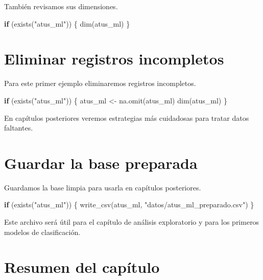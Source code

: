 \documentclass[
  11pt,
  letterpaper,
]{book}
\newenvironment{Shaded}{\begin{snugshade}}{\end{snugshade}}
\newcommand{\ControlFlowTok}[1]{\textcolor[rgb]{0.00,0.23,0.31}{\textbf{#1}}}
\newcommand{\FunctionTok}[1]{\textcolor[rgb]{0.28,0.35,0.67}{#1}}
\newcommand{\NormalTok}[1]{\textcolor[rgb]{0.00,0.23,0.31}{#1}}
\newcommand{\OtherTok}[1]{\textcolor[rgb]{0.00,0.23,0.31}{#1}}
\newcommand{\StringTok}[1]{\textcolor[rgb]{0.13,0.47,0.30}{#1}}
\begin{document}
También revisamos sus dimensiones.

\begin{Shaded}
\begin{Highlighting}[]
\ControlFlowTok{if}\NormalTok{ (}\FunctionTok{exists}\NormalTok{(}\StringTok{"atus\_ml"}\NormalTok{)) \{}
  \FunctionTok{dim}\NormalTok{(atus\_ml)}
\NormalTok{\}}
\end{Highlighting}
\end{Shaded}

\section{Eliminar registros
incompletos}\label{eliminar-registros-incompletos}

Para este primer ejemplo eliminaremos registros incompletos.

\begin{Shaded}
\begin{Highlighting}[]
\ControlFlowTok{if}\NormalTok{ (}\FunctionTok{exists}\NormalTok{(}\StringTok{"atus\_ml"}\NormalTok{)) \{}
\NormalTok{  atus\_ml }\OtherTok{\textless{}{-}} \FunctionTok{na.omit}\NormalTok{(atus\_ml)}
  \FunctionTok{dim}\NormalTok{(atus\_ml)}
\NormalTok{\}}
\end{Highlighting}
\end{Shaded}

En capítulos posteriores veremos estrategias más cuidadosas para tratar
datos faltantes.

\section{Guardar la base preparada}\label{guardar-la-base-preparada}

Guardamos la base limpia para usarla en capítulos posteriores.

\begin{Shaded}
\begin{Highlighting}[]
\ControlFlowTok{if}\NormalTok{ (}\FunctionTok{exists}\NormalTok{(}\StringTok{"atus\_ml"}\NormalTok{)) \{}
  \FunctionTok{write\_csv}\NormalTok{(atus\_ml, }\StringTok{"datos/atus\_ml\_preparado.csv"}\NormalTok{)}
\NormalTok{\}}
\end{Highlighting}
\end{Shaded}

Este archivo será útil para el capítulo de análisis exploratorio y para
los primeros modelos de clasificación.

\section{Resumen del capítulo}\label{resumen-del-capuxedtulo}
\end{document}
